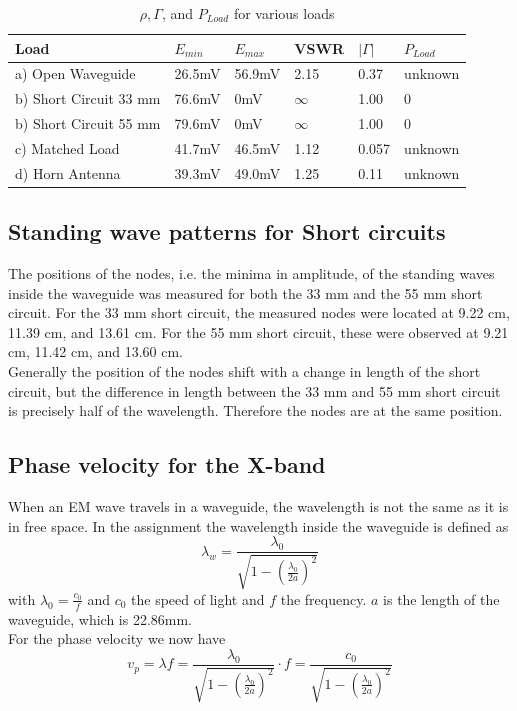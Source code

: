 \documentclass[11pt,a4paper]{article}
\begin{document}
\begin{table}[h]
\centering
\caption{$\rho, \Gamma$, and $P_{Load}$ for various loads}
\label{tab:LoadData}
\begin{tabular}{|l|l|l|l|l|l|}
\hline
Load                   & $E_{min}$ & $E_{max}$ & VSWR     & $|\Gamma|$ & $P_{Load}$  \\ \hline
a) Open Waveguide      & 26.5mV    & 56.9mV    & 2.15     & 0.37       & unknown            \\ \hline
b) Short Circuit 33 mm & 76.6mV    & 0mV       & $\infty$ & 1.00       & 0           \\ \hline
b) Short Circuit 55 mm & 79.6mV    & 0mV       & $\infty$ & 1.00       & 0           \\ \hline
c) Matched Load        & 41.7mV    & 46.5mV    & 1.12     & 0.057      & unknown            \\ \hline
d) Horn Antenna        & 39.3mV    & 49.0mV    & 1.25     & 0.11       & unknown            \\ \hline
\end{tabular}
\end{table}

\subsection{Standing wave patterns for Short circuits}
The positions of the nodes, i.e. the minima in amplitude, of the standing waves inside the waveguide was measured for both the 33 mm and the 55 mm short circuit. For the 33 mm short circuit, the measured nodes were located at 9.22 cm, 11.39 cm, and 13.61 cm. For the 55 mm short circuit, these were observed at 9.21 cm, 11.42 cm, and 13.60 cm.\\
Generally the position of the nodes shift with a change in length of the short circuit, but the difference in length between the 33 mm and 55 mm short circuit is precisely half of the wavelength. Therefore the nodes are at the same position.

\subsection{Phase velocity for the X-band}
When an EM wave travels in a waveguide, the wavelength is not the same as it is in free space. In the assignment the wavelength inside the waveguide is defined as 
\begin{equation}
\lambda_w=\frac{\lambda_0}{\sqrt{1-(\frac{\lambda_0}{2a})^2}}
\label{phase_velocity}
\end{equation}
with $\lambda_0=\frac{c_0}{f}$ and $c_0$ the speed of light and $f$ the frequency. $a$ is the length of the waveguide, which is 22.86mm.\\
For the phase velocity we now have 
\begin{equation}
v_p=\lambda f = \frac{\lambda_0}{\sqrt{1-(\frac{\lambda_0}{2a})^2}} \cdot f = \frac{c_0}{\sqrt{1-(\frac{\lambda_0}{2a})^2}}
\end{equation}
\end{document}
